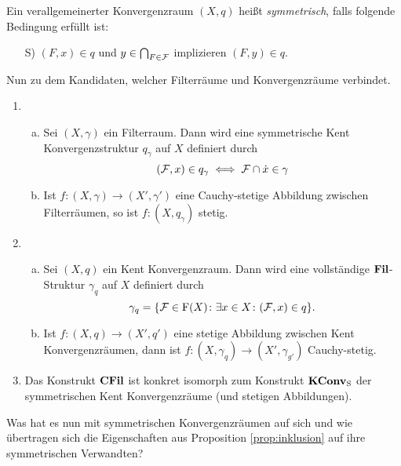\begin{defn}
  Ein verallgemeinerter Konvergenzraum $(X,q)$ heißt \emph{symmetrisch}, falls folgende Bedingung erfüllt ist:
  \begin{enumerate}[S1)]
    \item[S)] $(F,x) \in q$ und $y \in \bigcap_{F \in \mathcal{F}}$ implizieren $(F, y) \in q$.
  \end{enumerate}
\end{defn}

Nun zu dem Kandidaten, welcher Filterräume und Konvergenzräume verbindet.

\begin{prop}
  \begin{enumerate}[1)]
    \item \begin{enumerate}[a)]  
        \item Sei $(X, \gamma)$ ein Filterraum. Dann wird eine symmetrische Kent Konvergenzstruktur $q_\gamma$ auf $X$ definiert durch
          $$
          (\mathcal{F}, x) \in q_\gamma \iff \mathcal{F} \cap \dot x \in \gamma
          $$
        \item Ist $f \colon (X, \gamma) \to (X', \gamma')$ eine Cauchy-stetige Abbildung zwischen Filterräumen, so ist $f \colon (X, q_\gamma)$ stetig.
      \end{enumerate}
    \item \begin{enumerate}[a)]
        \item Sei $(X, q)$ ein Kent Konvergenzraum. Dann wird eine vollständige $\mathbf{Fil}$-Struktur $\gamma_q$ auf $X$ definiert durch
          $$
          \gamma_q = \{ \mathcal{F} \in \mathrm{F}(X) \colon \exists x \in X \colon (\mathcal{F}, x ) \in q \}.
          $$
        \item Ist $f \colon (X, q) \to (X', q')$ eine stetige Abbildung zwischen Kent Konvergenzräumen, dann ist $f \colon (X, \gamma_q) \to (X', \gamma_{g'})$ Cauchy-stetig.
      \end{enumerate}
    \item Das Konstrukt $\mathbf{CFil}$ ist konkret isomorph zum Konstrukt $\mathbf{KConv}_{\mathrm{S}}$ der symmetrischen Kent Konvergenzräume (und stetigen Abbildungen).
  \end{enumerate}
\end{prop}

Was hat es nun mit symmetrischen Konvergenzräumen auf sich und wie übertragen sich die Eigenschaften aus Proposition \ref{prop:inklusion} auf ihre symmetrischen Verwandten?

